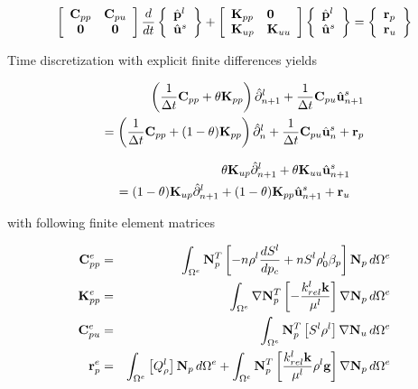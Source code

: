 \begin{eqnarray}
\left[
\begin{array}{cc}
\mathbf{C}_{pp} & \mathbf{C}_{pu}
\\
\mathbf{0} & \mathbf{0}
\end{array}
\right]
%
\frac{d}{dt}
\left\{
\begin{array}{l}
\hat\PressureVec^l
\\
\hat\Disp^s
\end{array}
\right\}
%
+
%
\left[
\begin{array}{ll}
\mathbf{K}_{pp} & \mathbf{0}
\\
\mathbf{K}_{up} & \mathbf{K}_{uu}
\end{array}
\right]
%
\left\{
\begin{array}{l}
\hat\PressureVec^l
\\
\hat\Disp^s
\end{array}
\right\}
%
=
\left\{
\begin{array}{l}
\mathbf{r}_p
\\
\mathbf{r}_u
\end{array}
\right\}
\nonumber
\\
\end{eqnarray}

Time discretization with explicit finite differences yields

\begin{eqnarray}
\left(
\frac{1}{\Delta t} \mathbf{C}_{pp} + \theta \mathbf{K}_{pp}
\right)
\hat{\partial}^l_{n+1}
+
\frac{1}{\Delta t} \mathbf{C}_{pu}
\hat{\mathbf u}^s_{n+1}
\nonumber\\
=
\left(
\frac{1}{\Delta t} \mathbf{C}_{pp} + (1-\theta) \mathbf{K}_{pp}
\right)
\hat{\partial}^l_{n}
+
\frac{1}{\Delta t} \mathbf{C}_{pu}
\hat{\mathbf u}^s_{n}
+
\mathbf r_p
\end{eqnarray}


\begin{eqnarray}
\theta \mathbf{K}_{up}
\hat{\partial}^l_{n+1}
+
\theta \mathbf{K}_{uu}
\hat{\mathbf u}^s_{n+1}
\nonumber\\
=
(1-\theta) \mathbf{K}_{up}
\hat{\partial}^l_{n+1}
+
(1-\theta) \mathbf{K}_{pp}
\hat{\mathbf u}^s_{n+1}
+
\mathbf r_u
\end{eqnarray}


with following finite element matrices

\begin{eqnarray}
\mathbf{C}^e_{pp}
&=&
\int_{\Omega^e}
{\mathbf{N}}_p^T
\left[
- n \rho^l \frac{dS^l}{dp_c}
+
n S^l \rho_0^l \beta_p
\right]
{\mathbf{N}}_p
\,
d\Omega^e
\nonumber
\\
\mathbf{K}^e_{pp}
&=&
\int_{\Omega^e}
\nabla{\mathbf{N}}_p^T
\left[
- \dfrac{k_{rel}^l\mathbf k}{\mu^l}
\right]
\nabla{\mathbf{N}}_p
\,
d\Omega^e
\nonumber
\\
\mathbf{C}^e_{pu}
&=&
\int_{\Omega^e}
{\mathbf{N}}_p^T
\left[
S^l \rho^l
\right]
\nabla\mathbf{N}_u
\,
d\Omega^e
\\
\mathbf r^e_{p}
&=&
\int_{\Omega^e}
\left[
Q^l_\rho
\right]
{\mathbf{N}}_p
\,
d\Omega^e
+
\int_{\Omega^e}
{\mathbf{N}}_p^T
\left[
\dfrac{k_{rel}^l\mathbf k}{\mu^l} \rho^l \mathbf g
\right]
\nabla{\mathbf{N}}_p
\,
d\Omega^e
\nonumber
\end{eqnarray}


